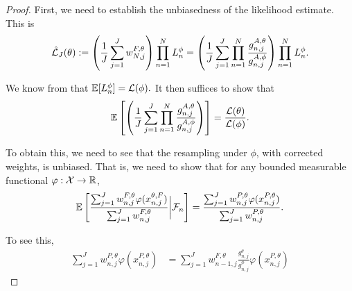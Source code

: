\documentclass{article}
\begin{document}
\begin{proof}
    First, we need to establish the unbiasedness of the likelihood estimate. This is 
    $$\hat{\mathcal{L}}_J(\theta) := \left(\frac{1}{J}\sum_{j=1}^J w_{N,j}^{F,\theta}\right)\prod_{n=1}^N L_n^\phi = \left(\frac{1}{J}\sum_{j=1}^J \prod_{n=1}^N \frac{g_{n,j}^{A,\theta}}{g_{n,j}^{A,\phi}} \right)\prod_{n=1}^N L_n^\phi.$$

    We know from \cite{chopin20} that $\mathbb{E}[L_n^{\phi}] = \mathcal{L}(\phi).$ It then suffices to show that
    $$\mathbb{E}\left[\left(\frac{1}{J}\sum_{j=1}^J \prod_{n=1}^N \frac{g_{n,j}^{A,\theta}}{g_{n,j}^{A,\phi}} \right)\right] = \frac{\mathcal{L}(\theta)}{\mathcal{L}(\phi)}.$$

    To obtain this, we need to see that the resampling under $\phi$, with corrected weights, is unbiased. That is, we need to show that for any bounded measurable functional $\varphi : {\mathcal{X}} \to \mathbb{R}$,
    $$\mathbb{E}\left[\frac{\sum_{j=1}^J w_{n,j}^{F, \theta} \varphi(x_{n,j}^{\theta, F})}{\sum_{j=1}^J w_{n,j}^{F, \theta}} \bigg| {\mathcal{F}}_n \right] = \frac{\sum_{j=1}^J w_{n,j}^{P, \theta} \varphi(x_{n,j}^{P, \theta})}{\sum_{j=1}^J w_{n,j}^{P, \theta} }. $$

    To see this, 
    \begin{align*}
        \sum_{j=1}^J w_{n,j}^{P, \theta} \varphi(x_{n,j}^{P, \theta}) 
        &= \sum_{j=1}^J w_{n-1,j}^{F, \theta}\frac{g_{n,j}^{\theta}}{g_{n,j}^{\phi}}  \varphi(x_{n,j}^{P, \theta})
    \end{align*}
    
    

    



\end{proof}
\end{document}
